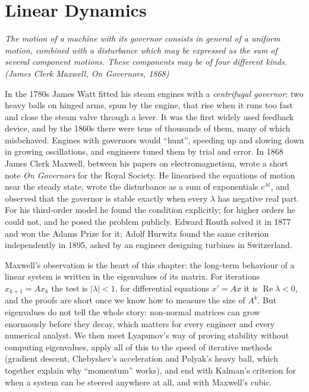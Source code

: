 \chapter{Linear Dynamics}\label{ch:dynamics}

\begin{center}\itshape
The motion of a machine with its governor consists in general of a uniform motion, combined with a disturbance which may be
expressed as the sum of several component motions. These components may be of four different kinds.
\upshape(James Clerk Maxwell, \emph{On Governors}, 1868)
\end{center}

In the 1780s James Watt fitted his steam engines with a \emph{centrifugal governor}: two heavy balls on hinged arms, spun by the
engine, that rise when it runs too fast and close the steam valve through a lever. It was the first widely used feedback device,
and by the 1860s there were tens of thousands of them, many of which misbehaved. Engines with governors would ``hunt'', speeding up
and slowing down in growing oscillations, and engineers tuned them by trial and error. In 1868 James Clerk Maxwell, between his
papers on electromagnetism, wrote a short note \emph{On Governors} for the Royal Society. He linearised the equations of motion
near the steady state, wrote the disturbance as a sum of exponentials $e^{\lambda t}$, and observed that the governor is stable
exactly when every $\lambda$ has negative real part. For his third-order model he found the condition explicitly; for higher
orders he could not, and he posed the problem publicly. Edward Routh solved it in 1877 and won the Adams Prize for it; Adolf
Hurwitz found the same criterion independently in 1895, asked by an engineer designing turbines in Switzerland.

Maxwell's observation is the heart of this chapter: the long-term behaviour of a linear system is written in the eigenvalues of its
matrix. For iterations $x_{k+1}=Ax_k$ the test is $|\lambda|<1$, for differential equations $x'=Ax$ it is $\operatorname{Re}\lambda<0$,
and the proofs are short once we know how to measure the size of $A^k$. But eigenvalues do not tell the whole story: non-normal
matrices can grow enormously before they decay, which matters for every engineer and every numerical analyst. We then meet
Lyapunov's way of proving stability without computing eigenvalues, apply all of this to the speed of iterative methods (gradient
descent, Chebyshev's acceleration and Polyak's heavy ball, which together explain why ``momentum'' works), and end with Kalman's
criterion for when a system can be steered anywhere at all, and with Maxwell's cubic.

